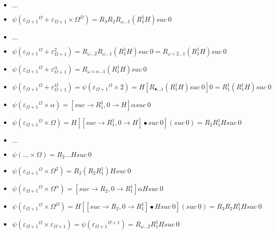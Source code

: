 \documentclass[10pt]{article}
\begin{document}
\begin{itemize}
\item \( \ldots \)

\item \( \psi({\varepsilon_{\Omega+1}}^\Omega+\varepsilon_{\Omega+1} \times \Omega^\Omega) = R_3 R_2 R_{\omega \ldots 1} (R^1_1 H) suc\ 0 \)

\item \( \ldots \)

\item \( \psi({\varepsilon_{\Omega+1}}^\Omega+\varepsilon_{\Omega+1}^2) = R_{\omega \ldots 2} R_{\omega \ldots 1} (R^1_1 H) suc\ 0 = R_{\omega \times 2 \ldots 1} (R^1_1 H) suc\ 0 \)

\item \( \psi({\varepsilon_{\Omega+1}}^\Omega+\varepsilon_{\Omega+1}^\alpha) = R_{\omega \times \alpha \ldots 1} (R^1_1 H) suc\ 0 \)

\item \( \psi({\varepsilon_{\Omega+1}}^\Omega+\varepsilon_{\Omega+1}^\Omega) = \psi({\varepsilon_{\Omega+1}}^\Omega \times 2) = H [R_{\bullet \ldots 1} (R^1_1 H) suc\ 0] 0 = R^1_1 (R^1_1 H) suc\ 0 \)

\item \( \psi({\varepsilon_{\Omega+1}}^\Omega \times \alpha) = [suc \rightarrow R^1_1, 0 \rightarrow H] \alpha suc\ 0 \)

\item \( \psi({\varepsilon_{\Omega+1}}^\Omega \times \Omega) = H [[suc \rightarrow R^1_1, 0 \rightarrow H] \bullet suc\ 0] (suc\ 0) = R_2 R^1_1 H suc\ 0 \)

\item \( \ldots \)

\item \( \psi(\ldots \times \Omega) = R_2 \ldots H suc\ 0 \)

\item \( \psi({\varepsilon_{\Omega+1}}^\Omega \times \Omega^2) = R_2 (R_2 R^1_1) H suc\ 0 \)

\item \( \psi({\varepsilon_{\Omega+1}}^\Omega \times \Omega^\alpha) = [suc \rightarrow R_2, 0 \rightarrow R^1_1] \alpha H suc\ 0 \)

\item \( \psi({\varepsilon_{\Omega+1}}^\Omega \times \Omega^\Omega) = H [[suc \rightarrow R_2, 0 \rightarrow R^1_1] \bullet H suc\ 0] (suc\ 0) = R_3 R_2 R^1_1 H suc\ 0 \)

\item \( \psi({\varepsilon_{\Omega+1}}^\Omega \times \varepsilon_{\Omega+1}) = \psi({\varepsilon_{\Omega+1}}^{\Omega+1}) = R_{\omega \ldots 2} R^1_1 H suc\ 0 \)


\end{itemize}
\end{document}
